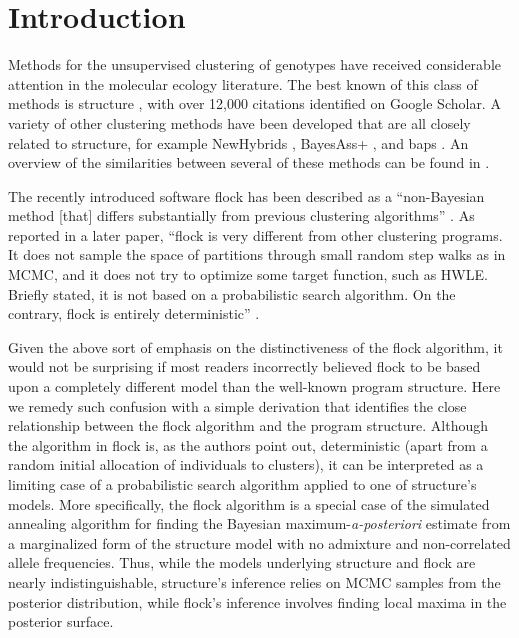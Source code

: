
\section*{Introduction}
Methods for the unsupervised clustering of genotypes have received 
considerable attention in the molecular ecology literature.  
The best known of this class of methods is {\sc structure} 
\citep{Pritchardetal2000}, with over 12,000 citations identified on 
Google Scholar.  A variety of other 
clustering methods have been developed that are all closely related to 
{\sc structure}, for example {\sc NewHybrids} \citep{And&Tho2002}, {\sc 
BayesAss+} \citep{Wil&Ran2003}, and {\sc baps} 
\citep{Coranderetal2004}. An overview of the similarities between several of these methods can be 
found in \citet{Anderson2009PGAC}.

The recently introduced software {\sc flock} \citep{Duc&Tur2009} has
been described
as a ``non-Bayesian method [that] 
differs substantially from previous 
clustering algorithms'' \citep[][p.~1333]{Duc&Tur2009}. As reported
in a later paper, ``{\sc flock} is very different from  other clustering 
programs. It does not sample the space of partitions through small 
random step walks as in MCMC, and it does not try to optimize some 
target function, such as HWLE\@. Briefly stated, it is not based on a 
probabilistic search algorithm. On the contrary, {\sc flock} is 
entirely deterministic'' \citep[][p.~736]{Duc&Tur2012}.

Given the above sort of emphasis on the distinctiveness of the {\sc flock}
algorithm, it would not be surprising if most readers incorrectly believed {\sc flock}
to be based upon a completely different model than the well-known program
{\sc structure}. Here we remedy such confusion with a simple derivation
that identifies 
the close relationship between the {\sc flock} algorithm and the program
{\sc structure}.  Although the algorithm in {\sc flock}
is, as the authors point out, deterministic (apart from a random initial allocation of 
individuals to clusters), it can be interpreted as a 
limiting case of a probabilistic search algorithm applied to one of {\sc structure}'s
models.  More specifically, the {\sc flock} 
algorithm is a special case of the simulated annealing
algorithm for finding the Bayesian maximum-{\em a-posteriori}
estimate from a marginalized form of the {\sc structure} model with no
admixture and non-correlated allele frequencies.  Thus, while the models underlying
{\sc structure} and {\sc flock} are nearly indistinguishable, {\sc structure}'s inference
relies on MCMC samples from the posterior distribution, while
{\sc flock}'s inference involves finding local maxima in the posterior surface.

